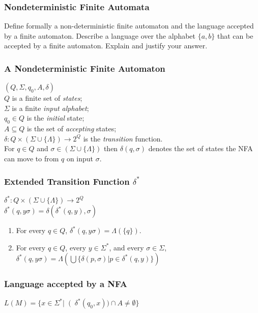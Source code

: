 

\begin{frame}
    \frametitle{Nondeterministic Finite Automata}
    Define formally a non-deterministic finite automaton and the language
    accepted by a finite automaton. Describe a language over the alphabet $\{a,
    b\}$ that can be accepted by a finite automaton. Explain and justify your
    answer.
\end{frame}

\begin{frame}
    \frametitle{A Nondeterministic Finite Automaton}
    $(Q,\Sigma,q_0, A,\delta)$\\
    $Q$ is a finite set of \emph{states};\\
    $\Sigma$ is a finite \emph{input alphabet};\\
    $q_0 \in Q$ is the \emph{initial} state;\\
    $A \subseteq Q$ is the set of \emph{accepting} states;\\
    $\delta : Q \times (\Sigma \cup \{\Lambda\}) \rightarrow 2^Q$ is the
    \emph{transition} function.\\
    For $q \in Q$ and $\sigma \in (\Sigma \cup \{\Lambda\})$ then $\delta(q,
    \sigma)$ denotes the set of states the NFA can move to from $q$ on input
    $\sigma$.
\end{frame}

\begin{frame}
    \frametitle{Extended Transition Function $\delta^\ast$}
    $\delta^\ast : Q \times (\Sigma \cup \{\Lambda\}) \rightarrow 2^Q$\\
    $\delta^\ast (q, y\sigma) = \delta(\delta^\ast (q, y), \sigma)$
    \begin{enumerate}
        \item For every $q \in Q$, $\delta^\ast (q, y\sigma) =
            \Lambda(\{q\})$.\\
        \item For every $q \in Q$, every $y \in \Sigma^\ast$, and every $\sigma
            \in \Sigma$, $\delta^\ast (q, y\sigma) = \Lambda(\bigcup \{
            \delta(p, \sigma) | p \in \delta^\ast(q, y)\})$
    \end{enumerate}
\end{frame}

\begin{frame}
    \frametitle{Language accepted by a NFA}
    $L(M) = \{x \in \Sigma^\ast \left|\right (\delta^\ast(q_0, x)) \cap A \neq
    \emptyset\}$
\end{frame}

